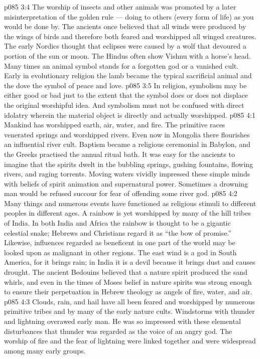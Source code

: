 \vs p085 3:4 The worship of insects and other animals was promoted by a later misinterpretation of the golden rule --- doing to others (every form of life) as you would be done by. The ancients once believed that all winds were produced by the wings of birds and therefore both feared and worshipped all winged creatures. The early Nordics thought that eclipses were caused by a wolf that devoured a portion of the sun or moon. The Hindus often show Vishnu with a horse’s head. Many times an animal symbol stands for a forgotten god or a vanished cult. Early in evolutionary religion the lamb became the typical sacrificial animal and the dove the symbol of peace and love.
\vs p085 3:5 In religion, symbolism may be either good or bad just to the extent that the symbol does or does not displace the original worshipful idea. And symbolism must not be confused with direct idolatry wherein the material object is directly and actually worshipped.
\vs p085 4:1 Mankind has worshipped earth, air, water, and fire. The primitive races venerated springs and worshipped rivers. Even now in Mongolia there flourishes an influential river cult. Baptism became a religious ceremonial in Babylon, and the Greeks practised the annual ritual bath. It was easy for the ancients to imagine that the spirits dwelt in the bubbling springs, gushing fountains, flowing rivers, and raging torrents. Moving waters vividly impressed these simple minds with beliefs of spirit animation and supernatural power. Sometimes a drowning man would be refused succour for fear of offending some river god.
\vs p085 4:2 Many things and numerous events have functioned as religious stimuli to different peoples in different ages. A rainbow is yet worshipped by many of the hill tribes of India. In both India and Africa the rainbow is thought to be a gigantic celestial snake; Hebrews and Christians regard it as “the bow of promise.” Likewise, influences regarded as beneficent in one part of the world may be looked upon as malignant in other regions. The east wind is a god in South America, for it brings rain; in India it is a devil because it brings dust and causes drought. The ancient Bedouins believed that a nature spirit produced the sand whirls, and even in the times of Moses belief in nature spirits was strong enough to ensure their perpetuation in Hebrew theology as angels of fire, water, and air.
\vs p085 4:3 Clouds, rain, and hail have all been feared and worshipped by numerous primitive tribes and by many of the early nature cults. Windstorms with thunder and lightning overawed early man. He was so impressed with these elemental disturbances that thunder was regarded as the voice of an angry god. The worship of fire and the fear of lightning were linked together and were widespread among many early groups.
